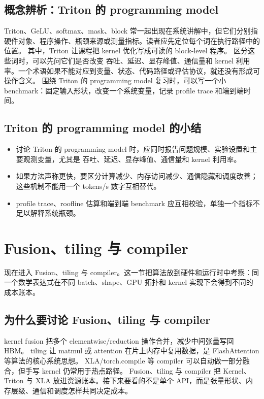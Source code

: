 \documentclass[a4paper]{article}
\begin{document}
\subsection{概念辨析：Triton 的 programming model}
Triton、GeLU、softmax、mask、block 常一起出现在系统讲解中，但它们分别指硬件对象、程序操作、瓶颈来源或测量指标。读者应先定位每个词在执行路径中的位置。
其中，Triton 让课程把 kernel 优化写成可读的 block-level 程序。
区分这些词时，可以先问它们是否改变 吞吐、延迟、显存峰值、通信量和 kernel 利用率。一个术语如果不能对应到变量、状态、代码路径或评估协议，就还没有形成可操作含义。
围绕 Triton 的 programming model 复习时，可以写一个小 benchmark：固定输入形状，改变一个系统变量，记录 profile trace 和端到端时间。
\subsection{Triton 的 programming model 的小结}
\begin{itemize}
\item 讨论 Triton 的 programming model 时，应同时报告问题规模、实验设置和主要观测变量，尤其是 吞吐、延迟、显存峰值、通信量和 kernel 利用率。
\item 如果方法声称更快，要区分计算减少、内存访问减少、通信隐藏和调度改善；这些机制不能用一个 tokens/s 数字互相替代。
\item profile trace、roofline 估算和端到端 benchmark 应互相校验，单独一个指标不足以解释系统瓶颈。
\end{itemize}
\section{Fusion、tiling 与 compiler}
现在进入 Fusion、tiling 与 compiler。这一节把算法放到硬件和运行时中考察：同一个数学表达式在不同 batch、shape、GPU 拓扑和 kernel 实现下会得到不同的成本账本。
\subsection{为什么要讨论 Fusion、tiling 与 compiler}
kernel fusion 把多个 elementwise/reduction 操作合并，减少中间张量写回 HBM。
tiling 让 matmul 或 attention 在片上内存中复用数据，是 FlashAttention 等算法的核心系统思想。
XLA/torch.compile 等 compiler 可以自动做一部分融合，但手写 kernel 仍常用于热点路径。
Fusion、tiling 与 compiler 把 Kernel、Triton 与 XLA 放进资源账本。接下来要看的不是单个 API，而是张量形状、内存层级、通信和调度怎样共同决定成本。
\end{document}
